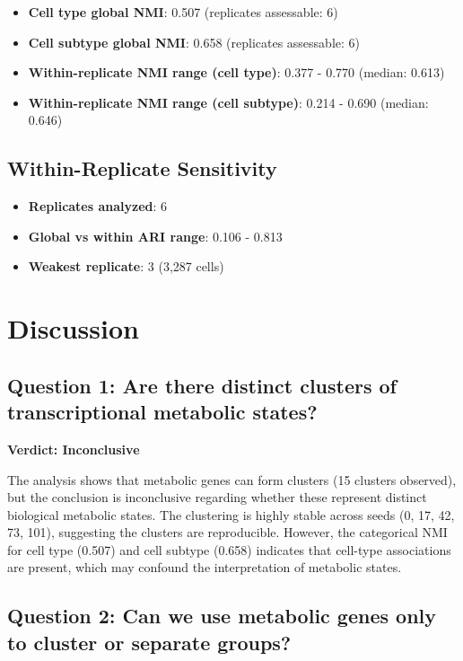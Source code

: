 \documentclass[11pt, a4paper]{article}
\begin{document}
\begin{itemize}
    \item \textbf{Cell type global NMI}: 0.507 (replicates assessable: 6)
    \item \textbf{Cell subtype global NMI}: 0.658 (replicates assessable: 6)
    \item \textbf{Within-replicate NMI range (cell type)}: 0.377 - 0.770 (median: 0.613)
    \item \textbf{Within-replicate NMI range (cell subtype)}: 0.214 - 0.690 (median: 0.646)
\end{itemize}

\subsection{Within-Replicate Sensitivity}

\begin{itemize}
    \item \textbf{Replicates analyzed}: 6
    \item \textbf{Global vs within ARI range}: 0.106 - 0.813
    \item \textbf{Weakest replicate}: 3 (3,287 cells)
\end{itemize}

\section{Discussion}

\subsection{Question 1: Are there distinct clusters of transcriptional metabolic states?}

\textbf{Verdict: Inconclusive}

The analysis shows that metabolic genes can form clusters (15 clusters observed), but the conclusion is inconclusive regarding whether these represent distinct biological metabolic states. The clustering is highly stable across seeds (0, 17, 42, 73, 101), suggesting the clusters are reproducible. However, the categorical NMI for cell type (0.507) and cell subtype (0.658) indicates that cell-type associations are present, which may confound the interpretation of metabolic states.

\subsection{Question 2: Can we use metabolic genes only to cluster or separate groups?}
\end{document}

